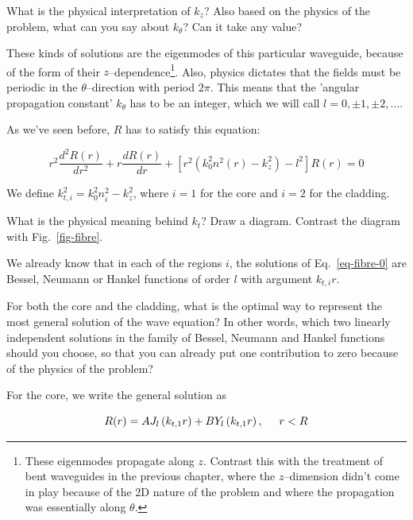 \begin{cue}
What is the physical interpretation of $k_z$? Also based on the physics of the problem, what can you say about $k_\theta $? Can it take any value?  
\end{cue}

These kinds of solutions are the eigenmodes of this particular waveguide, because of the form of their $z$--dependence\footnote{These eigenmodes propagate along $z$. Contrast this with the treatment of bent waveguides in the previous chapter, where the $z$--dimension didn't come in play because of the 2D nature of the problem and where the propagation was essentially along $\theta$.}.  Also, physics dictates that the fields must be periodic in the $\theta$--direction with period $2 \pi$. This means that the 'angular propagation constant' $k_\theta$ has to be an integer, which we will call $l = 0, \pm 1, \pm 2, \ldots$.

As we've seen before, $R$ has to satisfy this equation:

\begin{equation}
r^2\frac{d^2 R(r)}{d r^2} + r \frac{d R(r)}{d r} + \left[{r^2 \left(k_0^2 n^2(r) - k_z^2\right) - l^2}\right]R(r) = 0 \label{eq-fibre-0}
\end{equation} 

We define $k_{t,i}^2=k_0^2 n_i^2 - k_z^2$, where $i=1$ for the core and $i=2$ for the cladding.

\begin{exer}
What is the physical meaning behind $k_t$? Draw a diagram. Contrast the diagram with Fig.~\ref{fig-fibre}.
\end{exer}

We already know that in each of the regions $i$, the solutions of Eq.~\ref{eq-fibre-0} are Bessel, Neumann or Hankel functions of order $l$ with argument $k_{t,i} r$.

\begin{cue}
For both the core and the cladding, what is the optimal way to represent the most general solution of the wave equation? In other words, which two linearly independent solutions in the family of Bessel, Neumann and Hankel functions should you choose, so that you can already put one contribution to zero because of the physics of the problem?
\end{cue}

For the core, we write the general solution as

\begin{equation}
R(r) = A J_l\left(k_{t,1}r\right) + B Y_l\left(k_{t,1}r\right), \hspace{0.5 cm} r<R \label{eq-fibre-1}
\end{equation} 

